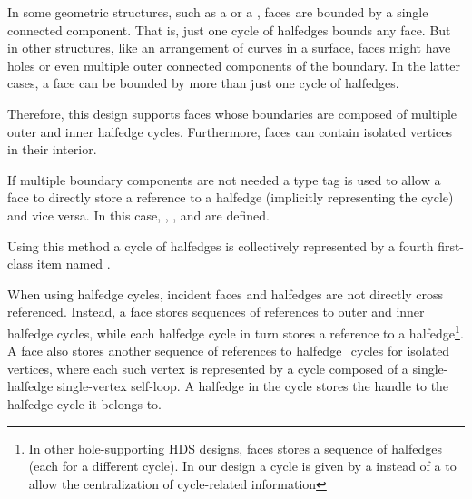 
{\XHDS
In some geometric structures, such as a  or a ,
faces are bounded by a single connected component. That is, just one cycle of halfedges bounds
any face. But in other structures, like an arrangement of curves in a surface, faces
might have holes or even multiple outer connected components of the boundary. 
In the latter cases, a face can be bounded by more than just one cycle of halfedges. 

Therefore, this design supports faces
whose boundaries are composed of multiple outer and inner halfedge cycles. Furthermore, faces can contain isolated vertices in their interior.




If multiple boundary components are not needed a type tag is used to allow a face to directly store 
a reference to a halfedge (implicitly representing the cycle) and vice versa. In this case, , ,  
and  are defined.


Using this method a cycle of halfedges is collectively represented 
by a fourth first-class  item named .

When using halfedge cycles, incident faces and halfedges are not directly cross referenced.
Instead, a face stores sequences of references to outer and inner halfedge cycles, while each 
halfedge cycle in turn stores a reference to a halfedge\footnote{In other
hole-supporting HDS designs, faces stores a sequence of halfedges (each for a different cycle).
In our design a cycle is given by a  instead of a  to allow 
the centralization of cycle-related information}. 
A face also stores another sequence of references to halfedge_cycles for isolated vertices, where
each such vertex is represented by a cycle composed of a single-halfedge single-vertex self-loop.
A halfedge in the cycle stores the handle to the halfedge cycle it belongs to.

}
